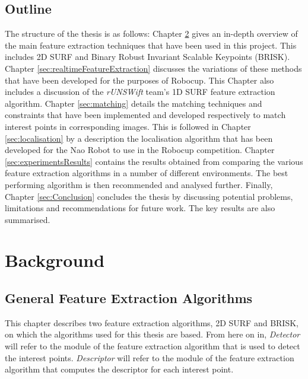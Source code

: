 \documentclass[11pt]{report}
\begin{document}
\section{Outline}
\label{sec:outline}
The structure of the thesis is as follows: Chapter \ref{sec:background} gives an in-depth overview of the main feature extraction techniques that have been used in this project. This includes 2D SURF and Binary Robust Invariant Scalable Keypoints (BRISK). Chapter \ref{sec:realtimeFeatureExtraction} discusses the variations of these methods that have been developed for the purposes of Robocup. This Chapter also includes a discussion of the \textit{rUNSWift} team's 1D SURF feature extraction algorithm. Chapter \ref{sec:matching} details the matching techniques and constraints that have been implemented and developed respectively to match interest points in corresponding images. This is followed in Chapter \ref{sec:localisation} by a description the localisation algorithm that has been developed for the Nao Robot to use in the Robocup competition. Chapter \ref{sec:experimentsResults} contains the results obtained from comparing the various feature extraction algorithms in a number of different environments. The best performing algorithm is then recommended and analysed further. Finally, Chapter \ref{sec:Conclusion} concludes the thesis by discussing potential problems, limitations and recommendations for future work. The key results are also summarised.\\



\chapter{Background}
\label{sec:background}

\section{General Feature Extraction Algorithms}
\label{sec:genFeatureExtract}
This chapter describes two feature extraction algorithms, 2D SURF and BRISK, on which the algorithms used for this thesis are based. From here on in, \textit{Detector} will refer to the module of the feature extraction algorithm that is used to detect the interest points. \textit{Descriptor} will refer to the module of the feature extraction algorithm that computes the descriptor for each interest point.\\
\end{document}
